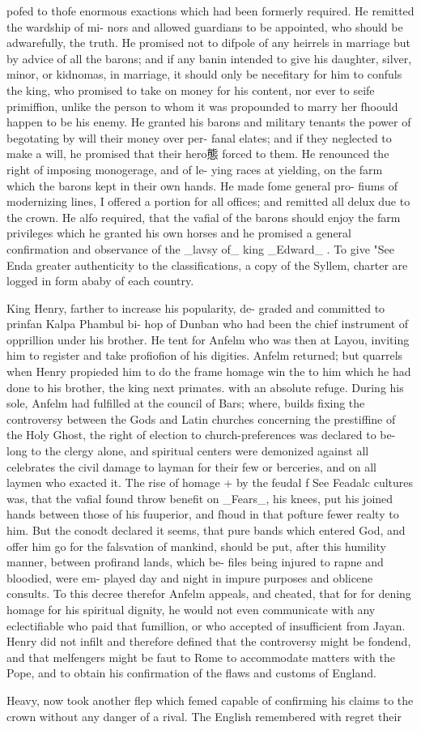 pofed to thofe enormous exactions which had been formerly required. He remitted the wardship of mi- nors and allowed guardians to be appointed, who should be adwarefully, the truth. He promised not to difpole of any heirrels in marriage but by advice of all the barons; and if any banin intended to give his daughter, silver, minor, or kidnomas, in marriage, it should only be necefitary for him to confuls the king, who promised to take on money for his content, nor ever to seife primiffion, unlike the person to whom it was propounded to marry her fhoould happen to be his enemy. He granted his barons and military tenants the power of begotating by will their money over per- fanal elates; and if they neglected to make a will, he promised that their hero態 forced to them. He renounced the right of imposing monogerage, and of le- ying races at yielding, on the farm which the barons kept in their own hands. He made fome general pro- fiums of modernizing lines, I offered a portion for all offices; and remitted all delux due to the crown. He alfo required, that the vafial of the barons should enjoy the farm privileges which he granted his own horses and he promised a general confirmation and observance of the \_lavsy of\_ king \_Edward\_ . To give "See Enda greater authenticity to the classifications, a copy of the Syllem, charter are logged in form ababy of each country.\par\medskip
King Henry, farther to increase his popularity, de- graded and committed to prinfan Kalpa Phambul bi- hop of Dunban who had been the chief instrument of opprillion under his brother. He tent for Anfelm who was then at Layou, inviting him to register and take profiofion of his digities. Anfelm returned; but quarrels when Henry propieded him to do the frame homage win the to him which he had done to his brother, the king next primates. with an absolute refuge. During his sole, Anfelm had fulfilled at the council of Bars; where, builds fixing the controversy between the Gods and Latin churches concerning the prestiffine of the Holy Ghost, the right of election to church-preferences was declared to be- long to the clergy alone, and spiritual centers were demonized against all celebrates the civil damage to layman for their few or berceries, and on all laymen who exacted it. The rise of homage + by the feudal f See Feadalc cultures was, that the vafial found throw benefit on \_Fears\_, his knees, put his joined hands between those of his fuuperior, and fhoud in that pofture fewer realty to him. But the conodt declared it seems, that pure bands which entered God, and offer him go for the falsvation of mankind, should be put, after this humility manner, between profirand lands, which be- files being injured to rapne and bloodied, were em- played day and night in impure purposes and oblicene consults. To this decree therefor Anfelm appeals, and cheated, that for for dening homage for his spiritual dignity, he would not even communicate with any eclectifiable who paid that fumillion, or who accepted of insufficient from Jayan. Henry did not infilt and therefore defined that the controversy might be fondend, and that melfengers might be faut to Rome to accommodate matters with the Pope, and to obtain his confirmation of the flaws and customs of England.\par\medskip
Heavy, now took another flep which femed capable of confirming his claims to the crown without any danger of a rival. The English remembered with regret their\par\medskip
